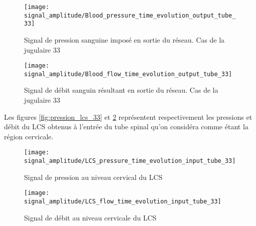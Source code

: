 \documentclass[french]{report}
\begin{document}
\begin{figure}
  \begin{minipage}[b]{0.5\linewidth}
    \centering
    \texttt{[image: signal\_amplitude/Blood\_pressure\_time\_evolution\_output\_tube\_33]}
    \caption{Signal de pression sanguine imposé en sortie du réseau. Cas de la jugulaire 33}
    \label{fig:pression_sang_33}
  \end{minipage}
  \hspace{0.5cm}
  \begin{minipage}[b]{0.5\linewidth}
    \centering
    \texttt{[image: signal\_amplitude/Blood\_flow\_time\_evolution\_output\_tube\_33]}
    \caption{Signal de débit sanguin résultant en sortie du réseau. Cas de la jugulaire 33}
    \label{fig:débit_sang_33}
  \end{minipage}
\end{figure}

Les figures \ref{fig:pression_lcs_33} et \ref{fig:débit_lcs_33} représentent respectivement les pressions et débit du LCS obtenus à l'entrée du tube spinal qu'on considéra comme étant la région cervicale.

\begin{figure}
  \begin{minipage}{0.5\linewidth}
    \centering
    \texttt{[image: signal\_amplitude/LCS\_pressure\_time\_evolution\_input\_tube\_33]}
    \caption{Signal de pression au niveau cervical du LCS}
    \label{fig:pression_lcs_33}
  \end{minipage}
  \hspace{0.5cm}
  \begin{minipage}{0.5\linewidth}
    \centering
    \texttt{[image: signal\_amplitude/LCS\_flow\_time\_evolution\_input\_tube\_33]}
    \caption{Signal de débit au niveau cervicale du LCS}
    \label{fig:débit_lcs_33}
  \end{minipage}
\end{figure}
\end{document}
